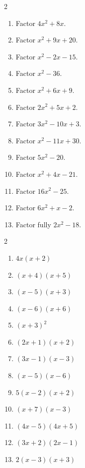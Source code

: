 \documentclass[11pt]{article}
\begin{document}
\begin{recapbox}
\begin{multicols}{2}
\small
\begin{enumerate}[leftmargin=*,itemsep=3pt]
  \item Factor $4x^2+8x$.
  \item Factor $x^2+9x+20$.
  \item Factor $x^2-2x-15$.
  \item Factor $x^2-36$.
  \item Factor $x^2+6x+9$.
  \item Factor $2x^2+5x+2$.
  \item Factor $3x^2-10x+3$.
  \item Factor $x^2-11x+30$.
  \item Factor $5x^2-20$.
  \item Factor $x^2+4x-21$.
  \item Factor $16x^2-25$.
  \item Factor $6x^2+x-2$.
  \item Factor fully $2x^2-18$.
\end{enumerate}
\end{multicols}
\end{recapbox}

\begin{keybox}
\begin{multicols}{2}
\small
\begin{enumerate}[leftmargin=*,itemsep=3pt]
  \item $4x(x+2)$
  \item $(x+4)(x+5)$
  \item $(x-5)(x+3)$
  \item $(x-6)(x+6)$
  \item $(x+3)^2$
  \item $(2x+1)(x+2)$
  \item $(3x-1)(x-3)$
  \item $(x-5)(x-6)$
  \item $5(x-2)(x+2)$
  \item $(x+7)(x-3)$
  \item $(4x-5)(4x+5)$
  \item $(3x+2)(2x-1)$
  \item $2(x-3)(x+3)$
\end{enumerate}
\end{multicols}
\end{keybox}
\end{document}
